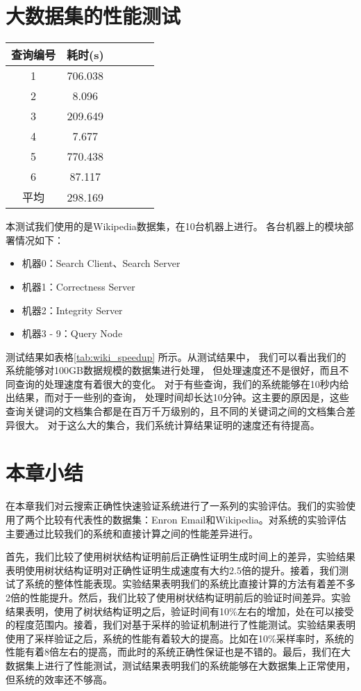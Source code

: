 \section {大数据集的性能测试}
\begin{table}[htb]
    \centering
    \begin{tabular}{cccccc}
        \toprule
        查询编号 & 耗时(s) \\
        \midrule
        1 & 706.038  \\
        2 & 8.096  \\
        3 & 209.649  \\
        4 & 7.677  \\
        5 & 770.438  \\
        6 & 87.117  \\
        \midrule
        平均 & 298.169  \\
        \bottomrule
    \end{tabular}
\end{table}
本测试我们使用的是Wikipedia数据集，在10台机器上进行。
各台机器上的模块部署情况如下：
\begin{itemize}
\item 机器0：Search Client、Search Server
\item 机器1：Correctness Server
\item 机器2：Integrity Server
\item 机器3 - 9：Query Node
\end{itemize}

测试结果如表格\ref{tab:wiki_speedup} 所示。从测试结果中，
我们可以看出我们的系统能够对100GB数据规模的数据集进行处理，
但处理速度还不是很好，而且不同查询的处理速度有着很大的变化。
对于有些查询，我们的系统能够在10秒内给出结果，而对于一些别的查询，
处理时间却长达10分钟。这主要的原因是，这些查询关键词的文档集合都是在百万千万级别的，且不同的关键词之间的文档集合差异很大。
对于这么大的集合，我们系统计算结果证明的速度还有待提高。

\section{本章小结}
在本章我们对云搜索正确性快速验证系统进行了一系列的实验评估。我们的实验使用了两个比较有代表性的数据集：Enron Email和Wikipedia。对系统的实验评估主要通过比较我们的系统和直接计算之间的性能差异进行。

首先，我们比较了使用树状结构证明前后正确性证明生成时间上的差异，实验结果表明使用树状结构证明对正确性证明生成速度有大约2.5倍的提升。接着，我们测试了系统的整体性能表现。实验结果表明我们的系统比直接计算的方法有着差不多2倍的性能提升。然后，我们比较了使用树状结构证明前后的验证时间差异。实验结果表明，使用了树状结构证明之后，验证时间有10\%左右的增加，处在可以接受的程度范围内。接着，我们对基于采样的验证机制进行了性能测试。实验结果表明使用了采样验证之后，系统的性能有着较大的提高。比如在10\%采样率时，系统的性能有着8倍左右的提高，而此时的系统正确性保证也是不错的。最后，我们在大数据集上进行了性能测试，测试结果表明我们的系统能够在大数据集上正常使用，但系统的效率还不够高。

